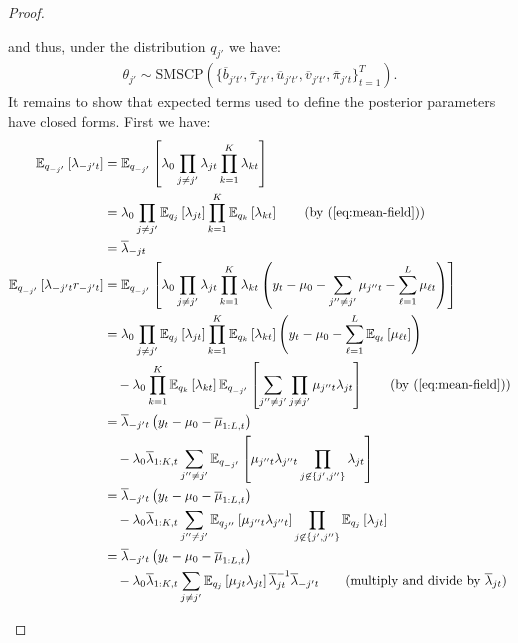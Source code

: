 \begin{proof}
\begin{enumerate}[label=\roman*.]
and thus, under the distribution $q_{j'}$ we have:
\begin{align*}
    \theta_{j'} \sim \text{SMSCP}(\{\overline{b}_{j't'} , \overline{\tau}_{j't'}, \overline{u}_{j't'}, \overline{v}_{j't'}, \overline{\pi}_{j't}\}_{t=1}^T).
\end{align*}
It remains to show that expected terms used to define the posterior parameters have closed forms. First we have:
\footnotesize
\begin{align*}
    \E_{q_{-j'}}\left[\lambda_{-j't}\right] &= \E_{q_{-j'}}\left[\lambda_0\prod_{j \neq j'}\lambda_{jt} \prod_{k=1}^K \lambda_{kt}\right] \\
    &= \lambda_0\prod_{j \neq j'}\E_{q_{j}}\left[\lambda_{jt}\right] \prod_{k=1}^K \E_{q_{k}}\left[\lambda_{kt}\right] \tag{by (\ref{eq:mean-field})} \\
    &= \overline{\lambda}_{-jt} \\
    \E_{q_{-j'}}\left[\lambda_{-j't}r_{-j't}\right] &= \E_{q_{-j'}}\left[\lambda_0\prod_{j \neq j'}\lambda_{jt} \prod_{k=1}^K \lambda_{kt}\left(y_t - \mu_0 - \sum_{j''\neq j'} \mu_{j''t} - \sum_{\ell=1}^L \mu_{\ell t}\right)\right] \\
    &= \lambda_0\prod_{j \neq j'}\E_{q_{j}}\left[\lambda_{jt}\right] \prod_{k=1}^K \E_{q_{k}}\left[\lambda_{kt}\right]\left(y_t -\mu_0 -\sum_{\ell=1}^L\E_{q_{\ell}}\left[\mu_{\ell t}\right]\right) \\
    &\quad-\lambda_0\prod_{k=1}^K \E_{q_{k}}\left[\lambda_{kt}\right]\E_{q_{-j'}}\left[\sum_{j'' \neq j'}\prod_{j \neq j'} \mu_{j''t}\lambda_{jt}\right]  \tag{by (\ref{eq:mean-field})} \\
    &=  \overline{\lambda}_{-j't} \left(y_t -\mu_0 -\overline{\mu}_{1:L, t}\right) \\
    &\quad-\lambda_0\overline{\lambda}_{1:K,t} \sum_{j'' \neq j'}\E_{q_{-j'}}\left[ \mu_{j''t}\lambda_{j''t}\prod_{j \not\in\{j',j''\}} \lambda_{jt}\right]  \\
    &= \overline{\lambda}_{-j't} \left(y_t -\mu_0 -\overline{\mu}_{1:L, t}\right) \\
    &\quad-\lambda_0\overline{\lambda}_{1:K,t} \sum_{j'' \neq j'}\E_{q_{j''}}\left[ \mu_{j''t}\lambda_{j''t} \right] \prod_{j \not\in\{j',j''\}} \E_{q_{j}}\left[\lambda_{jt}\right] \\
    &= \overline{\lambda}_{-j't} \left(y_t -\mu_0 -\overline{\mu}_{1:L, t}\right) \\
    &\quad-\lambda_0\overline{\lambda}_{1:K,t} \sum_{j \neq j'}\E_{q_{j}}\left[ \mu_{jt}\lambda_{jt} \right] \overline{\lambda}_{jt}^{-1}\overline{\lambda}_{-j't}\tag{multiply and divide by $\overline{\lambda}_{jt}$}\\

\end{align*}
\end{enumerate}
\end{proof}
